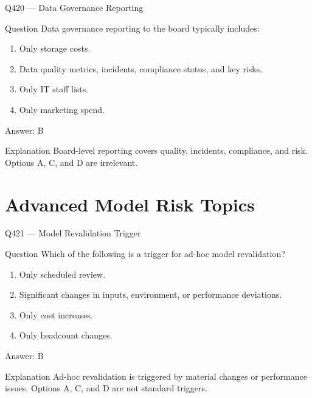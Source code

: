 \documentclass[aspectratio=169,8pt]{beamer}
\begin{document}
	\begin{frame}{Q420 --- Data Governance Reporting}
		\begin{block}{Question}
			Data governance reporting to the board typically includes:
			\begin{enumerate}
				\item Only storage costs.
				\item Data quality metrics, incidents, compliance status, and key risks.
				\item Only IT staff lists.
				\item Only marketing spend.
			\end{enumerate}
		\end{block}
		\begin{exampleblock}{Answer: B}\end{exampleblock}
		\begin{block}{Explanation}
			Board-level reporting covers quality, incidents, compliance, and risk. Options A, C, and D are irrelevant.
		\end{block}
	\end{frame}
	
	\section{Advanced Model Risk Topics}
	
	\begin{frame}{Q421 --- Model Revalidation Trigger}
		\begin{block}{Question}
			Which of the following is a trigger for ad-hoc model revalidation?
			\begin{enumerate}
				\item Only scheduled review.
				\item Significant changes in inputs, environment, or performance deviations.
				\item Only cost increases.
				\item Only headcount changes.
			\end{enumerate}
		\end{block}
		\begin{exampleblock}{Answer: B}\end{exampleblock}
		\begin{block}{Explanation}
			Ad-hoc revalidation is triggered by material changes or performance issues. Options A, C, and D are not standard triggers.
		\end{block}
	\end{frame}
	
\end{document}
